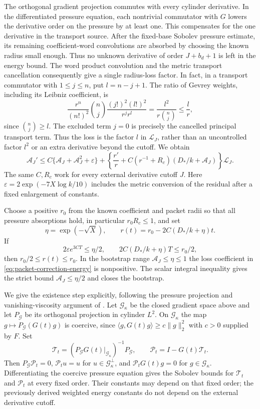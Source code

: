 The orthogonal gradient projection commutes with every cylinder
derivative. In the differentiated pressure equation, each nontrivial
commutator with $G$ lowers the derivative order on the pressure by at
least one. This compensates for the one derivative in the transport
source. After the fixed-base Sobolev pressure estimate, its remaining
coefficient-word convolutions are absorbed by choosing the known radius
small enough. Thus no unknown derivative of order $J+b_d+1$ is left in
the energy bound. The word product convolution and the metric transport
cancellation consequently give a single radius-loss factor. In fact, in
a transport commutator with $1\le j\le n$, put $l=n-j+1$. The ratio of
Gevrey weights, including its Leibniz coefficient, is
\[
 \frac{r^n}{(n!)^2}\binom nj
   \frac{(j!)^2(l!)^2}{r^j r^l}
   =\frac{l^2}{r\binom nj}\le\frac lr,
\]
since $\binom nj\ge l$. The excluded term $j=0$ is precisely the
cancelled principal transport term. Thus the loss is the factor $l$
in $\mathcal L_J$, rather than an uncontrolled factor $l^2$ or an
extra derivative beyond the cutoff. We obtain
\begin{equation}\label{eq:packet-correction-energy}
 \mathcal A_J'
 \le C\{\mathcal A_J+\mathcal A_J^2+\varepsilon\}
  +\left\{\frac{r'}{r}
       +C(r^{-1}+R_c)(D_*/k+\mathcal A_J)\right\}\mathcal L_J.
\end{equation}
The same $C,R_c$ work for every external derivative cutoff $J$.
Here $\varepsilon=2\exp(-7X\log k/10)$ includes the metric conversion
of the residual after a fixed enlargement of constants.

Choose a positive $r_0$ from the known coefficient and packet radii so
that all pressure absorptions hold, in particular $r_0R_c\le1$, and set
\[
 \eta=\exp(-\sqrt X),\qquad
 r(t)=r_0-2C(D_*/k+\eta)t.
\]
If
\begin{equation}\label{eq:packet-correction-guards}
 2\varepsilon e^{3CT}\le\eta/2,
 \qquad 2C(D_*/k+\eta)T\le r_0/2,
\end{equation}
then $r_0/2\le r(t)\le r_0$. In the bootstrap range
$\mathcal A_J\le\eta\le1$ the loss coefficient in
\eqref{eq:packet-correction-energy} is nonpositive. The scalar integral
inequality gives the strict bound $\mathcal A_J\le\eta/2$ and closes
the bootstrap.

We give the existence step explicitly, following the pressure projection
and vanishing-viscosity argument of \cite[\S3.6]{OAI}. Let
$\mathscr G_\kappa$ be the closed gradient space above and let
$P_{\mathscr G}$ be its orthogonal projection in cylinder $L^2$.
On $\mathscr G_\kappa$ the map
$g\mapsto P_{\mathscr G}(G(t)g)$ is coercive, since
$\langle g,G(t)g\rangle\ge c\|g\|_2^2$ with $c>0$ supplied by $F$.
Set
\[
 \mathcal T_t=(P_{\mathscr G}G(t)|_{\mathscr G_\kappa})^{-1}
                         P_{\mathscr G},\qquad
 \mathcal P_t=I-G(t)\mathcal T_t.
\]
Then $P_{\mathscr G}\mathcal P_t=0$,
$\mathcal P_tu=u$ for $u\in\mathscr G_\kappa^\perp$, and
$\mathcal P_tG(t)g=0$ for $g\in\mathscr G_\kappa$.
Differentiating the coercive pressure equation gives the Sobolev bounds
for $\mathcal T_t$ and $\mathcal P_t$ at every fixed order. Their constants
may depend on that fixed order; the previously derived weighted energy
constants do not depend on the external derivative cutoff.

